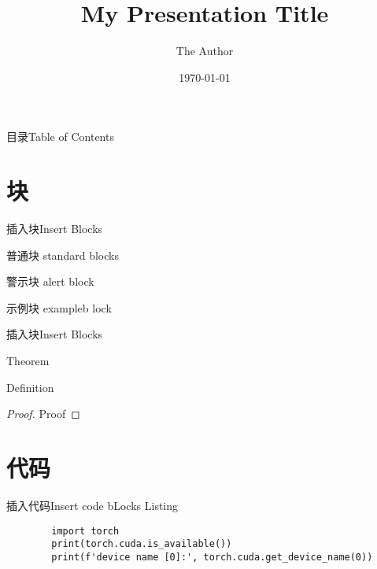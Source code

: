 \documentclass[aspectratio=169, UTF8]{ctexbeamer}
\author{The Author}
\date{\today}
\title{My Presentation Title}
\begin{document}
\begin{frame}
    \maketitle
\end{frame}

\begin{frame}{目录}{Table of Contents}
    \centering
    \tableofcontents[hideallsubsections]
\end{frame}

\section[Block]{块}

\begin{frame}{插入块}{Insert Blocks}
    \begin{block}{普通块}
        standard blocks
    \end{block}
    \begin{alertblock}{警示块}
        alert block
    \end{alertblock}
    \begin{exampleblock}{示例块}
        exampleb lock
    \end{exampleblock}
\end{frame}

\begin{frame}{插入块}{Insert Blocks}
    \begin{theorem}
        Theorem
    \end{theorem}
    \begin{definition}
        Definition
    \end{definition}
    \begin{proof}
        Proof
    \end{proof}
\end{frame}
\section[Code block]{代码}

\begin{frame}[fragile]{插入代码}{Insert code bLocks}
    Listing
    \begin{lstlisting}
        import torch
        print(torch.cuda.is_available())
        print(f'device name [0]:', torch.cuda.get_device_name(0))
    \end{lstlisting}
\end{frame}
\end{document}
